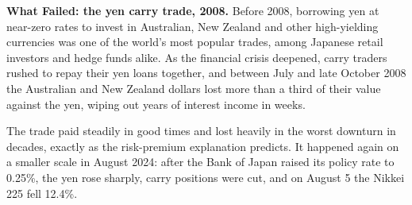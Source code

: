 \begin{callout}
\textbf{What Failed: the yen carry trade, 2008.} Before 2008, borrowing yen at near-zero rates to invest in Australian, New Zealand and other high-yielding currencies was one of the world's most popular trades, among Japanese retail investors and hedge funds alike. As the financial crisis deepened, carry traders rushed to repay their yen loans together, and between July and late October 2008 the Australian and New Zealand dollars lost more than a third of their value against the yen, wiping out years of interest income in weeks.

The trade paid steadily in good times and lost heavily in the worst downturn in decades, exactly as the risk-premium explanation predicts. It happened again on a smaller scale in August 2024: after the Bank of Japan raised its policy rate to 0.25\%, the yen rose sharply, carry positions were cut, and on August 5 the Nikkei 225 fell 12.4\%.
\end{callout}
